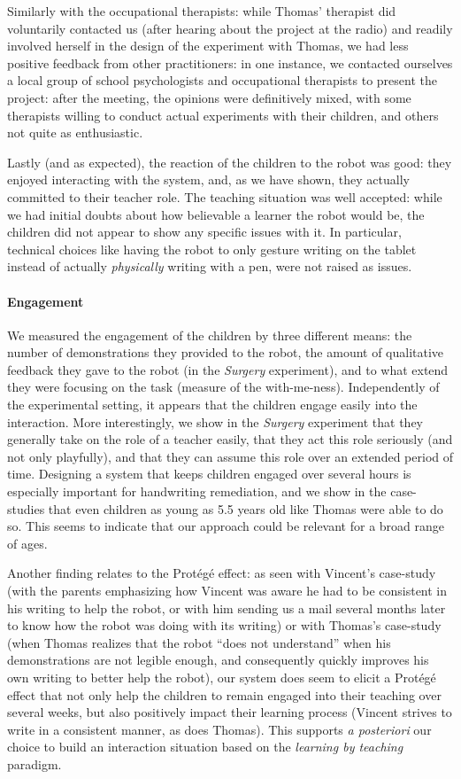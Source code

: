 \documentclass{article}
\begin{document}
Similarly with the occupational therapists: while Thomas' therapist did
voluntarily contacted us (after hearing about the project at the radio) and
readily involved herself in the design of the experiment with Thomas, we had
less positive feedback from other practitioners: in one instance, we contacted
ourselves a local group of school psychologists and occupational therapists to
present the project: after the meeting, the opinions were definitively mixed,
with some therapists willing to conduct actual experiments with their children,
and others not quite as enthusiastic.

Lastly (and as expected), the reaction of the children to the robot was good:
they enjoyed interacting with the system, and, as we have shown, they actually
committed to their teacher role. The teaching situation was well accepted: while
we had initial doubts about how believable a learner the robot would be, the
children did not appear to show any specific issues with it. In particular,
technical choices like having the robot to only gesture writing on the tablet
instead of actually \emph{physically} writing with a pen, were not raised as
issues.

\paragraph{Engagement} We measured the engagement of the children by three
different means: the number of demonstrations they provided to the robot, the
amount of qualitative feedback they gave to the robot (in the \emph{Surgery}
experiment), and to what extend they were focusing on the task (measure of the
with-me-ness). Independently of the experimental setting, it appears that the
children engage easily into the interaction. More interestingly, we show in the
\emph{Surgery} experiment that they generally take on the role of a teacher
easily, that they act this role seriously (and not only playfully), and that
they can assume this role over an extended period of time. Designing a system
that keeps children engaged over several hours is especially important for
handwriting remediation, and we show in the case-studies that even children as
young as 5.5 years old like Thomas were able to do so. This seems to indicate
that our approach could be relevant for a broad range of ages.

Another finding relates to the Protégé effect: as seen with Vincent's case-study
(with the parents emphasizing how Vincent was aware he had to be consistent in
his writing to help the robot, or with him sending us a mail several months
later to know how the robot was doing with its writing) or with Thomas's
case-study (when Thomas realizes that the robot ``does not understand'' when his
demonstrations are not legible enough, and consequently quickly improves his
own writing to better help the robot), our system does seem to elicit a Protégé
effect that not only help the children to remain engaged into their teaching
over several weeks, but also positively impact their learning process (Vincent
strives to write in a consistent manner, as does Thomas). This supports {\it a
posteriori} our choice to build an interaction situation based on the
\emph{learning by teaching} paradigm.
\end{document}
